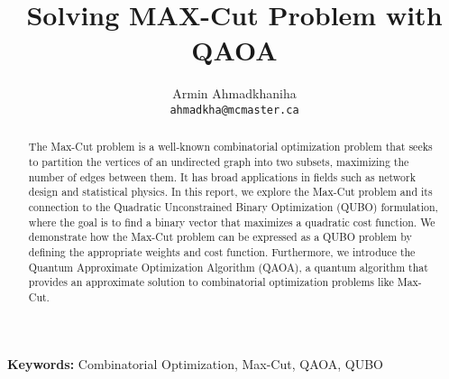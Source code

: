 \documentclass[12pt]{article}
\title{Solving MAX-Cut Problem with QAOA}
\author{Armin Ahmadkhaniha \\ \texttt{ahmadkha@mcmaster.ca}}
\begin{document}
\maketitle

\begin{abstract}
The Max-Cut problem is a well-known combinatorial optimization problem that seeks to partition the vertices of an undirected graph into two subsets, maximizing the number of edges between them. It has broad applications in fields such as network design and statistical physics. In this report, we explore the Max-Cut problem and its connection to the Quadratic Unconstrained Binary Optimization (QUBO) formulation, where the goal is to find a binary vector that maximizes a quadratic cost function. We demonstrate how the Max-Cut problem can be expressed as a QUBO problem by defining the appropriate weights and cost function. Furthermore, we introduce the Quantum Approximate Optimization Algorithm (QAOA), a quantum algorithm that provides an approximate solution to combinatorial optimization problems like Max-Cut. 
\end{abstract}

\textbf{Keywords:} Combinatorial Optimization, Max-Cut, QAOA, QUBO
\end{document}
